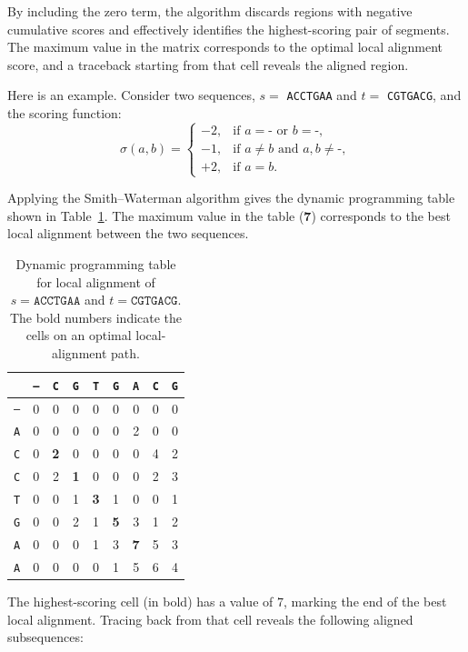 By including the zero term, the algorithm discards regions with negative cumulative scores
and effectively identifies the highest-scoring pair of segments. The maximum value in the
matrix corresponds to the optimal local alignment score, and a traceback starting from that
cell reveals the aligned region.



Here is an example. Consider two sequences, $s =$ \texttt{ACCTGAA} and $t =$ \texttt{CGTGACG}, and the scoring function:
\[
\sigma(a,b) =
\begin{cases}
-2, & \text{if } a = \texttt{-} \text{ or } b = \texttt{-},\\[4pt]
-1, & \text{if } a \neq b \text{ and } a,b \neq \texttt{-},\\[4pt]
+2, & \text{if } a = b.
\end{cases}
\]

Applying the Smith--Waterman algorithm gives the dynamic programming table shown in Table~\ref{t:smith-waterman}. 
The maximum value in the table (\textbf{7}) corresponds to the best local alignment between the two sequences.

\begin{table}[h!]
\centering
\caption{Dynamic programming table for local alignment of $s=\texttt{ACCTGAA}$ and $t=\texttt{CGTGACG}$. 
The bold numbers indicate the cells on an optimal local-alignment path.}
\label{t:smith-waterman}
\begin{tabular}{c|cccccccc}
\hline
 & \texttt{–} & \texttt{C} & \texttt{G} & \texttt{T} & \texttt{G} & \texttt{A} & \texttt{C} & \texttt{G} \\
\hline
\texttt{–} & 0 & 0 & 0 & 0 & 0 & 0 & 0 & 0 \\
\texttt{A} & 0 & 0 & 0 & 0 & 0 & 2 & 0 & 0 \\
\texttt{C} & 0 & \textbf{2} & 0 & 0 & 0 & 0 & 4 & 2 \\
\texttt{C} & 0 & 2 & \textbf{1} & 0 & 0 & 0 & 2 & 3 \\
\texttt{T} & 0 & 0 & 1 & \textbf{3} & 1 & 0 & 0 & 1 \\
\texttt{G} & 0 & 0 & 2 & 1 & \textbf{5} & 3 & 1 & 2 \\
\texttt{A} & 0 & 0 & 0 & 1 & 3 & \textbf{7} & 5 & 3 \\
\texttt{A} & 0 & 0 & 0 & 0 & 1 & 5 & 6 & 4 \\
\hline
\end{tabular}
\end{table}

The highest-scoring cell (in bold) has a value of $7$, marking the end of the best local alignment. 
Tracing back from that cell reveals the following aligned subsequences:


